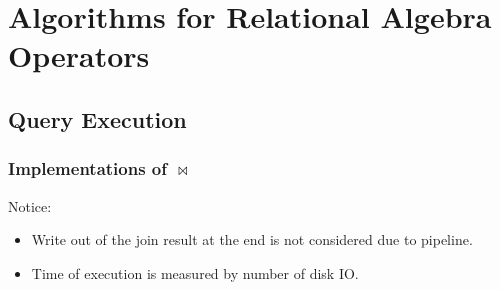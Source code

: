 \documentclass[a4paper]{report}
\begin{document}
\section{Algorithms for Relational Algebra Operators}
\subsection{Query Execution}
\subsubsection{Implementations of $\bowtie$}

Notice:
\begin{itemize}
\item Write out of the join result at the end is not considered due to pipeline.
\item Time of execution is measured by number of disk IO. 
\end{itemize}
\end{document}
